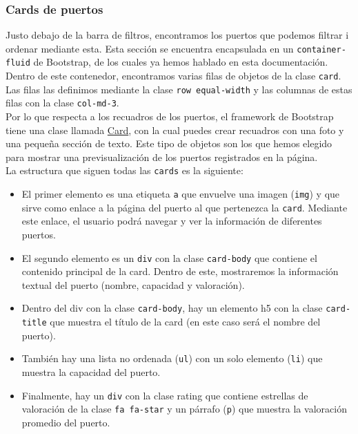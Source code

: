 \documentclass{article}
\begin{document}
\subsubsection{Cards de puertos}
Justo debajo de la barra de filtros, encontramos los puertos que podemos filtrar i ordenar mediante esta. Esta sección se encuentra encapsulada en un \texttt{container-fluid} de Bootstrap, de los cuales ya hemos hablado en esta documentación. Dentro de este contenedor, encontramos varias filas de objetos de la clase \texttt{card}. Las filas las definimos mediante la clase \texttt{row equal-width} y las columnas de estas filas con la clase \texttt{col-md-3}.\\

\noindent Por lo que respecta a los recuadros de los puertos, el framework de Bootstrap tiene una clase llamada \href{https://getbootstrap.com/docs/5.3/components/card/}{Card}, con la cual puedes crear recuadros con una foto y una pequeña sección de texto. Este tipo de objetos son los que hemos elegido para mostrar una previsualización de los puertos registrados en la página.\\

\noindent La estructura que siguen todas las \texttt{cards} es la siguiente:
\begin{itemize}
    \item El primer elemento es una etiqueta \texttt{a} que envuelve una imagen (\texttt{img}) y que sirve como enlace a la página del puerto al que pertenezca la \texttt{card}. Mediante este enlace, el usuario podrá navegar y ver la información de diferentes puertos.
    \item El segundo elemento es un \texttt{div} con la clase \texttt{card-body} que contiene el contenido principal de la card. Dentro de este, mostraremos la información textual del puerto (nombre, capacidad y valoración).
    \item Dentro del div con la clase \texttt{card-body}, hay un elemento h5 con la clase \texttt{card-title} que muestra el título de la card (en este caso será el nombre del puerto).
    \item También hay una lista no ordenada (\texttt{ul}) con un solo elemento (\texttt{li}) que muestra la capacidad del puerto.
    \item Finalmente, hay un \texttt{div} con la clase rating que contiene estrellas de valoración de la clase \texttt{fa fa-star} y un párrafo (\texttt{p}) que muestra la valoración promedio del puerto.
\end{itemize}
\end{document}
